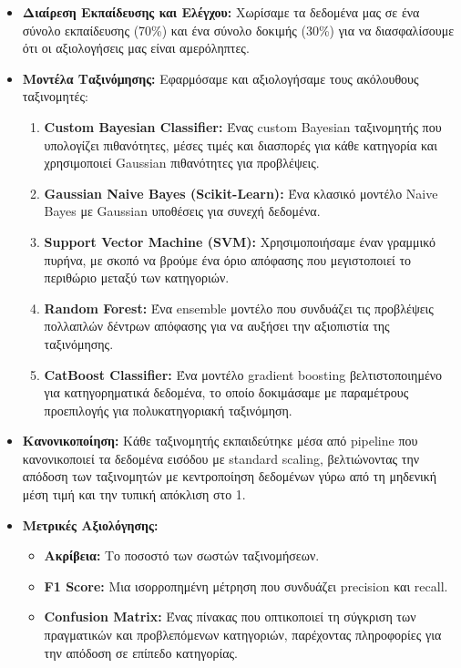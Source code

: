 \documentclass[a4paper,12pt]{article}
\begin{document}
\begin{itemize}
    \item \textbf{Διαίρεση Εκπαίδευσης και Ελέγχου:} Χωρίσαμε τα δεδομένα μας σε ένα σύνολο εκπαίδευσης (70\%) και ένα σύνολο δοκιμής (30\%) για να διασφαλίσουμε ότι οι αξιολογήσεις μας είναι αμερόληπτες.
    
    \item \textbf{Μοντέλα Ταξινόμησης:} Εφαρμόσαμε και αξιολογήσαμε τους ακόλουθους ταξινομητές:
    \begin{enumerate}
        \item \textbf{Custom Bayesian Classifier:} Ένας custom Bayesian ταξινομητής που υπολογίζει πιθανότητες, μέσες τιμές και διασπορές για κάθε κατηγορία και χρησιμοποιεί Gaussian πιθανότητες για προβλέψεις.
        \item \textbf{Gaussian Naive Bayes (Scikit-Learn):} Ένα κλασικό μοντέλο Naive Bayes με Gaussian υποθέσεις για συνεχή δεδομένα.
        \item \textbf{Support Vector Machine (SVM):} Χρησιμοποιήσαμε έναν γραμμικό πυρήνα, με σκοπό να βρούμε ένα όριο απόφασης που μεγιστοποιεί το περιθώριο μεταξύ των κατηγοριών.
        \item \textbf{Random Forest:} Ένα ensemble μοντέλο που συνδυάζει τις προβλέψεις πολλαπλών δέντρων απόφασης για να αυξήσει την αξιοπιστία της ταξινόμησης.
        \item \textbf{CatBoost Classifier:} Ένα μοντέλο gradient boosting βελτιστοποιημένο για κατηγορηματικά δεδομένα, το οποίο δοκιμάσαμε με παραμέτρους προεπιλογής για πολυκατηγοριακή ταξινόμηση.
    \end{enumerate}
    
    \item \textbf{Κανονικοποίηση:} Κάθε ταξινομητής εκπαιδεύτηκε μέσα από pipeline που κανονικοποιεί τα δεδομένα εισόδου με standard scaling, βελτιώνοντας την απόδοση των ταξινομητών με κεντροποίηση δεδομένων γύρω από τη μηδενική μέση τιμή και την τυπική απόκλιση στο 1.

    \item \textbf{Μετρικές Αξιολόγησης:}
    \begin{itemize}
        \item \textbf{Ακρίβεια:} Το ποσοστό των σωστών ταξινομήσεων.
        \item \textbf{F1 Score:} Μια ισορροπημένη μέτρηση που συνδυάζει precision και recall.
        \item \textbf{Confusion Matrix:} Ένας πίνακας που οπτικοποιεί τη σύγκριση των πραγματικών και προβλεπόμενων κατηγοριών, παρέχοντας πληροφορίες για την απόδοση σε επίπεδο κατηγορίας.
    \end{itemize}
\end{itemize}
\end{document}
